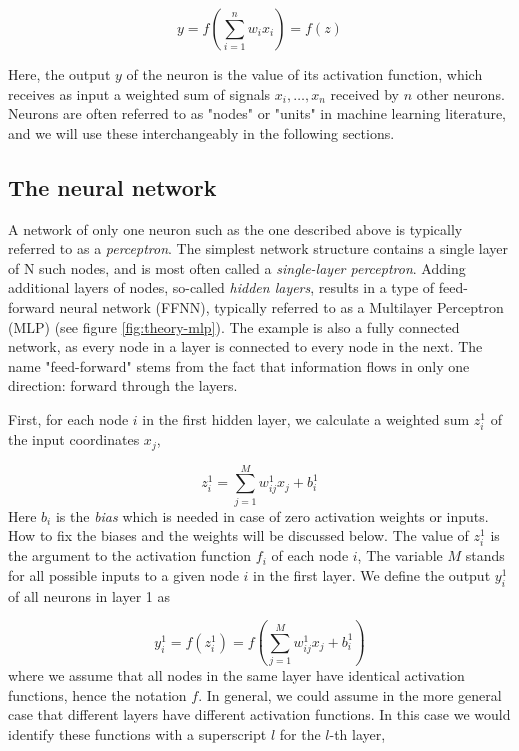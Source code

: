 \begin{equation}\label{eq:artificial-neuron}
 y = f\left(\sum_{i=1}^n w_ix_i\right) = f(z)
\end{equation}

Here, the output $y$ of the neuron is the value of its activation function,
which receives as input a weighted sum of signals $x_i, \dots ,x_n$ received by $n$ other neurons.
Neurons are often referred to as "nodes" or "units" in machine learning literature,
and we will use these interchangeably in the following sections.

\subsection{The neural network}
A network of only one neuron such as the one described above is typically referred
to as a \textit{perceptron}. The simplest network structure contains a
single layer of N such nodes, and is most often called a \textit{single-layer perceptron}.
Adding additional layers of nodes, so-called \textit{hidden layers}, results in a
type of feed-forward neural network (FFNN), typically referred to as a Multilayer Perceptron (MLP)
(see figure \ref{fig:theory-mlp}). The example is also a fully connected network, as every
node in a layer is connected to every node in the next. The name "feed-forward" stems from
the fact that information flows in only one direction: forward through the layers.

First, for each node $i$ in the first hidden layer, we calculate a weighted sum $z_i^1$ of the input coordinates $x_j$,

\begin{equation} 
	z_i^1 = \sum_{j=1}^{M} w_{ij}^1 x_j + b_i^1
\end{equation}
Here $b_i$ is the \textit{bias} which is needed in
case of zero activation weights or inputs. How to fix the biases and
the weights will be discussed below.  The value of $z_i^1$ is the
argument to the activation function $f_i$ of each node $i$, The
variable $M$ stands for all possible inputs to a given node $i$ in the
first layer.  We define  the output $y_i^1$ of all neurons in layer 1 as

\begin{equation}\label{eq:output-layer}
	y_i^1 = f(z_i^1) = f\left(\sum_{j=1}^M w_{ij}^1 x_j  + b_i^1\right)
\end{equation}
where we assume that all nodes in the same layer have identical
activation functions, hence the notation $f$. In general, we could assume in the more general case that different layers have different activation functions.
In this case we would identify these functions with a superscript $l$ for the $l$-th layer,

